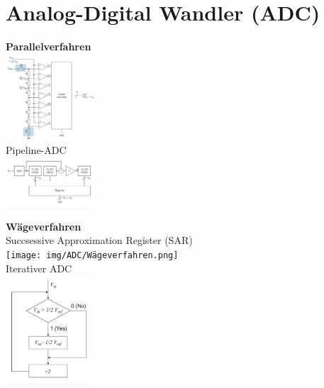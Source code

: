 \documentclass[margin=normal]{tex/hsrzf}
\begin{document}
\section{Analog-Digital Wandler (ADC)}
\begin{multicols}{3}
  \begin{minipage}{0.29\textwidth}
    \textbf{Parallelverfahren}
    \\\includegraphics[width=0.25\textwidth]{img/ADC/Parallel-Verfahren.png}
    \\Pipeline-ADC
    \\\includegraphics[width=0.25\textwidth]{img/ADC/Pipeline.png}
  \end{minipage}

  \begin{minipage}{0.29\textwidth}
    \textbf{Wägeverfahren}
    \\Succsessive Approximation Register (SAR)
    \\\texttt{[image: img/ADC/Wägeverfahren.png]}
    \\Iterativer ADC
    \\\includegraphics[width=0.25\textwidth]{img/ADC/IterativerADC.png}
  \end{minipage}


\end{multicols}
\end{document}
